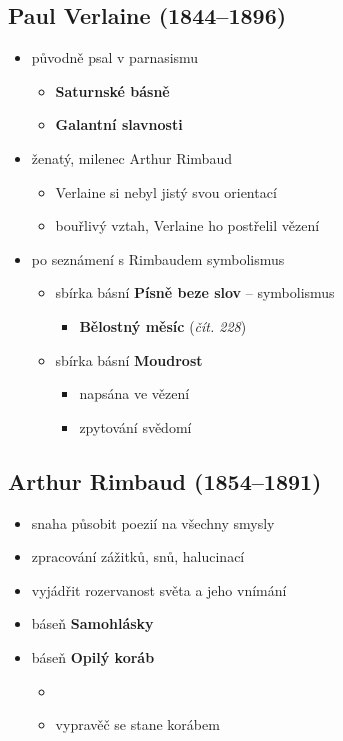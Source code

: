 \subsection{Paul Verlaine (1844--1896)}
\begin{itemize}
\item původně psal v parnasismu
	\begin{itemize}
	\item \textbf{Saturnské básně}
	\item \textbf{Galantní slavnosti}
	\end{itemize}
\item ženatý, milenec Arthur Rimbaud
	\begin{itemize}
	\item Verlaine si nebyl jistý svou orientací
	\item bouřlivý vztah, Verlaine ho postřelil \ra vězení
	\end{itemize}
\item po seznámení s Rimbaudem symbolismus
	\begin{itemize}
	\item sbírka básní \textbf{Písně beze slov} -- symbolismus
		\begin{itemize}
		\item \textbf{Bělostný měsíc} (\textit{čít. 228})
		\end{itemize}
	\item sbírka básní \textbf{Moudrost}
		\begin{itemize}
		\item napsána ve vězení
		\item zpytování svědomí 
		\end{itemize}
	\end{itemize}
\end{itemize}

\subsection{Arthur Rimbaud (1854--1891)}
\begin{itemize}
\item snaha působit poezií na všechny smysly
\item zpracování zážitků, snů, halucinací
\item vyjádřit rozervanost světa a jeho vnímání
\item báseň \textbf{Samohlásky}
\item báseň \textbf{Opilý koráb}
	\begin{itemize}
	\item 
	\item vypravěč se stane korábem
	\end{itemize}
\end{itemize}



